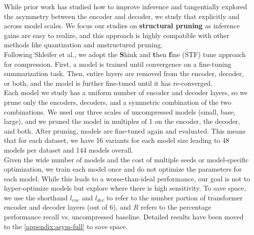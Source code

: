 While prior work has studied how to improve inference and tangentially explored the asymmetry between the encoder and decoder, we study that explicitly and across model scales. We focus our studies on \textbf{structural pruning} as inference gains are easy to realize, and this approach is highly compatible with other methods like quantization and unstructured pruning.\\
Following Shleifer et al., we adopt the \textbf{S}hink and \textbf{t}hen \textbf{f}ine (STF) tune approach for compression. First, a model is trained until convergence on a fine-tuning summarization task. Then, entire layers are removed from the encoder, decoder, or both, and the model is further fine-tuned until it has re-converged. \\
Each model we study has a uniform number of encoder and decoder layers, so we prune only the encoders, decoders, and a symmetric combination of the two combinations. We used our three scales of uncompressed models (small, base, large), and we pruned the model in multiples of 1 on the encoder, the decoder, and both. After pruning, models are fine-tuned again and evaluated. This means that for each dataset, we have 16 variants for each model size leading to 48 models per dataset and 144 models overall. \\
Given the wide number of models and the cost of multiple seeds or model-specific optimization, we train each model once and do not optimize the parameters for each model. While this leads to a worse-than-ideal performance, our goal is not to hyper-optimize models but explore where there is high sensitivity. To save space, we use the shorthand $l_{enc}$ and $l_{dec}$ to refer to the number portion of transformer encoder and decoder layers (out of 6), and $R$ refers to the percentage performance recall vs. uncompressed baseline. Detailed results have been moved to the \ref{appendix:asym-full} to save space.\\
